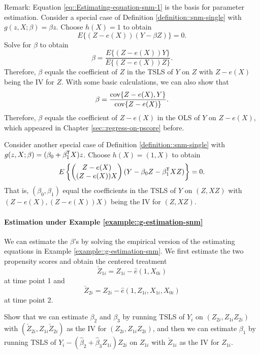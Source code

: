  


Remark:  Equation \eqref{eq::Estimating-equation-snm-1} is the basis for parameter estimation. 
Consider a special case of Definition \ref{definition::snm-single} with $g(z,X;\beta) = \beta z$. Choose $h(X) = 1$ to obtain
$$
E\{   (Z-e(X))   (Y-  \beta Z) \}  = 0.
$$
Solve for $\beta$ to obtain
$$
\beta = \frac{   E\{ (Z-e(X)) Y \}   }{   E\{ (Z-e(X))  Z\}   }.
$$
Therefore, $\beta$ equals the coefficient of $Z$ in the TSLS of $Y$ on $Z$ with $Z-e(X)$ being the IV for $Z$. With some basic calculations, we can also show that
$$
\beta = \frac{   \textup{cov}\{ Z-e(X), Y\}   }{ \textup{cov}\{ Z-e(X) \}  }.
$$
Therefore, $\beta$ equals the coefficient of $Z-e(X)$ in the OLS of $Y$ on $Z-e(X)$, which appeared in Chapter \ref{sec::regress-on-pscore} before. 

Consider another special case of Definition \ref{definition::snm-single} with $g(z,X;\beta) = (\beta_0 + \beta_1^{\mkern-1.5mu\mathsf{T}} X) z$. Choose $h(X) = (1,X)$ to obtain
$$
E\left\{   \begin{pmatrix}
Z-e(X)\\
(Z-e(X)) X
\end{pmatrix}  
(Y-  \beta_0 Z - \beta_1^{\mkern-1.5mu\mathsf{T}} XZ) \right\}  = 0.
$$
That is, $(\beta_0,\beta_1)$ equal the coefficients in the TSLS of $Y$ on $(Z, XZ)$ with $(Z-e(X),  (Z-e(X)) X )$ being the IV for $(Z, XZ)$. 



\paragraph{Estimation under Example \ref{example::g-estimation-snm}}\label{problem::snm-estimation-example}
 

We can estimate the $\beta$'s by solving the empirical version of the estimating equations in Example \ref{example::g-estimation-snm}. We first estimate the two propensity scores and obtain the centered treatment 
$$
\check{Z}_{1i} = Z_{1i} - \hat{e}(1,X_{0i})
$$
 at time point 1 and 
 $$
 \check{Z}_{2i} = Z_{2i}  - \hat{e}(1, Z_{1i}, X_{1i}, X_{0i})
 $$
 at time point 2. 


Show that we can estimate $\beta_2$ and $\beta_3$ by running TSLS of $Y_i$ on $(Z_{2i}, Z_{1i} Z_{2i} )$ with $( \check{Z}_{2i} ,  Z_{1i}\check{Z}_{2i} )$ as the IV for $(Z_{2i}, Z_{1i} Z_{2i} )$, and then we can estimate $\beta_1$ by running TSLS of $Y_i - (\hat{\beta}_2+\hat{\beta}_3 Z_{1i}) Z_{2i}$ on $Z_{1i}$ with $\check{Z}_{1i} $ as the IV for $Z_{1i}$. 
 
 
 
